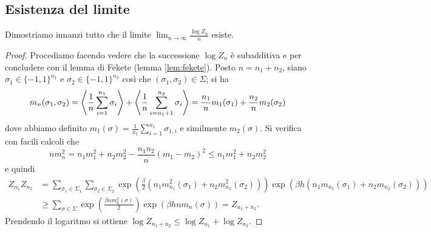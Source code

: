 \subsection{Esistenza del limite}
Dimostriamo innanzi tutto che il limite $ \lim_{n\to\infty} \frac{\log Z_n}{n} $ esiste.
\begin{proof}
    Procediamo facendo vedere che la successione $ \log Z_n $ è subadditiva e per concludere con il lemma di Fekete (lemma \ref{lem:fekete}).
    Posto $ n = n_1 + n_2 $, siano $ \sigma_1 \in \{-1,1\}^{n_1} $ e $ \sigma_2 \in \{-1,1\}^{n_2} $ così che $ (\sigma_1, \sigma_2) \in \Sigma $; si ha
    \[ m_n(\sigma_1,\sigma_2) = \left< \frac{1}{n} \sum_{i=1}^{n_1} \sigma_i \right> + \left< \frac{1}{n} \sum_{i=n_1 + 1}^{n_2} \sigma_i \right> = \frac{n_1}{n} m_1(\sigma_1) + \frac{n_2}{n} m_2(\sigma_2) \]
    dove abbiamo definito $ m_1(\sigma) = \frac{1}{n_1} \sum_{i=1}^{n_1}\sigma_{1, i} $ e similmente $ m_2(\sigma) $. Si verifica con facili calcoli che
    \[ n m_n^2 = n_1 m_1^2 + n_2 m_2^2 - \frac{n_1 n_2}{n} (m_1-m_2)^2 \leq n_1 m_1^2 + n_2 m_2^2 \]
    e quindi
    \begin{align*}
        Z_{n_1} Z_{n_2} & = \sum_{\sigma_1\in\Sigma_1} \sum_{\sigma_2\in\Sigma_2} \exp\left(\frac{\beta}{2} \left(n_1 m_{n_1}^2(\sigma_1) + n_2 m_{n_2}^2(\sigma_2) \right) \right) \exp\left(\beta h\left(n_1 m_{n_1}(\sigma_1) + n_2 m_{n_2}(\sigma_2) \right) \right) \\
                        & \geq \sum_{\sigma\in\Sigma} \exp\left(\frac{\beta n m_n^2(\sigma)}{2} \right) \exp\left(\beta h n m_n(\sigma) \right) = Z_{n_1+n_2}.
    \end{align*}
    Prendendo il logaritmo si ottiene $ \log Z_{n_1+n_2} \leq \log Z_{n_1} + \log Z_{n_2} $.
\end{proof}

